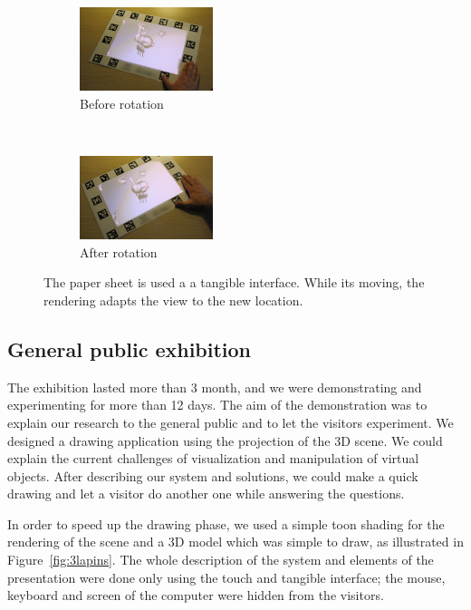 \documentclass{article}
\begin{document}
\begin{figure}[!h]
        \begin{subfigure}[b]{0.23\textwidth}
                \centering
                \includegraphics[width=3.9cm]{proj1}
                \caption{Before rotation}
                \label{fig:lapin1}
        \end{subfigure}
        ~ %
        \begin{subfigure}[b]{0.23\textwidth}
                \centering
                \includegraphics[width=3.9cm]{proj2}
                \caption{After rotation}
                \label{fig:lapin2}
        \end{subfigure}
        \caption{The paper sheet is used a a tangible interface. While its moving, the rendering adapts the view to the new location.}\label{fig:lapins1}
\end{figure}

\subsection*{General public exhibition}

The exhibition lasted more than 3 month, and we were demonstrating and experimenting for more than 12 days. The aim of the demonstration was to explain our research to the general public and to let the visitors experiment. We designed a drawing application using the projection of the 3D scene. We could explain the current challenges of visualization and manipulation of virtual objects. After describing our system and solutions, we could make a quick drawing and let a visitor do another one while answering the questions.

In order to speed up the drawing phase, we used a simple toon shading for the rendering of the scene and a 3D model which was simple to draw, as illustrated in Figure~\ref{fig:3lapins}. The whole description of the system and elements of the presentation were done only using the touch and tangible interface; the mouse, keyboard and screen of the computer were hidden from the visitors.
\end{document}
